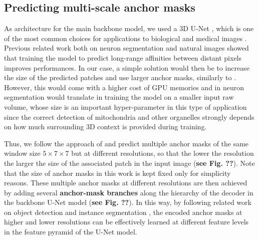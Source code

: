 \subsection{Predicting multi-scale anchor masks}\label{sec:multiscale_patches}
As architecture for the main backbone model, we used a 3D U-Net \cite{ronneberger2015u,cciccek20163d}, which is one of the most common choices for applications to biological and medical images .  
Previous related work both on neuron segmentation \cite{lee2017superhuman} and natural images \cite{liu2018affinity,Gao_2019_ICCV} showed that training the model to predict long-range affinities between distant pixels improves performances. In our case, a simple solution would then be to increase the size of the predicted patches and use larger anchor masks, similarly to \cite{hirsch2020patchperpix}. However, this would come with a higher cost of GPU memories and in neuron segmentation would translate in training the model on a smaller input raw volume, whose size is an important hyper-parameter in this type of application since the correct detection of mitochondria and other organelles strongly depends on how much surrounding 3D context is provided during training. 

Thus, we follow the approach of \cite{Gao_2019_ICCV} and predict multiple anchor masks of the same window size $5\times 7 \times 7$ but at different resolutions, so that the lower the resolution the larger the size of the associated patch in the input image (\textbf{see Fig. ??}). 
Note that the size of anchor masks in this work is kept fixed only for simplicity reasons.
These multiple anchor masks at different resolutions are then achieved by adding several \textbf{anchor-mask branches} along the hierarchy of the decoder in the backbone U-Net model (\textbf{see Fig. ??}). In this way, by following related work on object detection and instance segmentation \cite{Gao_2019_ICCV,lin2017feature}, the encoded anchor masks at higher and lower resolutions can be effectively learned at different feature levels in the feature pyramid of the U-Net model.



